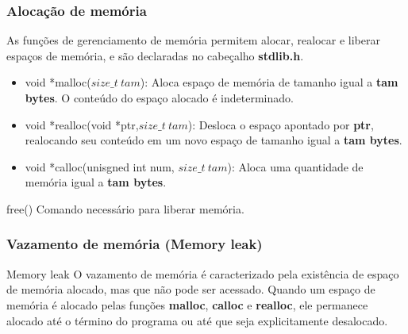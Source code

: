 \begin{frame}
\frametitle{Alocação de memória}


As funções de gerenciamento de memória permitem alocar, realocar e liberar espaços
de memória, e são declaradas no cabeçalho \textbf{stdlib.h}.

\begin{itemize}

\item void *malloc($size\_t \ tam$):\linebreak
Aloca espaço de memória de tamanho igual a \textbf{tam bytes}. O conteúdo do espaço alocado é indeterminado.



\item void *realloc(void *ptr,$size\_t \ tam$):\linebreak
Desloca o espaço apontado por \textbf{ptr}, realocando seu conteúdo em um novo espaço de tamanho igual a \textbf{tam bytes}.


\item void *calloc(unisgned int num, $size\_t \ tam$):\linebreak
Aloca uma quantidade de memória igual a \textbf{tam bytes}.


\end{itemize}


\begin{block}{free()}
Comando necessário para liberar memória.
\end{block}



\end{frame}


\begin{frame}
\frametitle{Vazamento de memória (Memory leak)}




\begin{block}{Memory leak}
O vazamento de memória é caracterizado pela existência de espaço de memória alocado,
mas que não pode ser acessado. Quando um espaço de memória é alocado pelas
funções \textbf{malloc}, \textbf{calloc} e \textbf{realloc}, ele permanece alocado até o término do programa
ou até que seja explicitamente desalocado. 
\end{block}


\end{frame}

